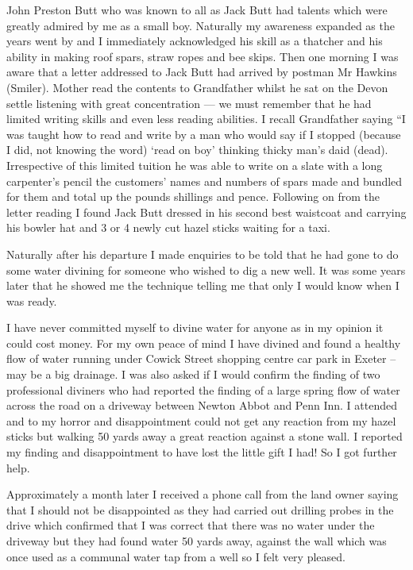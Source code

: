 John Preston Butt who was known to all as Jack Butt had talents which were
greatly admired by me as a small boy. Naturally my awareness expanded as the
years went by and I immediately acknowledged his skill as a thatcher and his
ability in making roof spars, straw ropes and bee skips. Then one morning I
was aware that a letter addressed to Jack Butt had arrived by postman Mr
Hawkins (Smiler). Mother read the contents to Grandfather whilst he sat on the
Devon settle listening with great concentration --- we must remember that he
had limited writing skills and even less reading abilities. I recall
Grandfather saying ``I was taught how to read and write by a man who would say
if I stopped (because I did, not knowing the word) `read on boy' thinking
thicky man's daid (dead). Irrespective of this limited tuition he was able to
write on a slate with a long carpenter's pencil the customers' names and
numbers of spars made and bundled for them and total up the pounds shillings
and pence. Following on from the letter reading I found Jack Butt dressed in
his second best waistcoat and carrying his bowler hat and 3 or 4 newly cut
hazel sticks waiting for a taxi.

Naturally after his departure I made enquiries to be told that he had gone to do
some water divining for someone who wished to dig a new well. It was some
years later that he showed me the technique telling me that only I would know
when I was ready.

I have never committed myself to divine water for anyone as in my opinion it
could cost money. For my own peace of mind I have divined and found a healthy
flow of water running under Cowick Street shopping centre car park in Exeter –
may be a big drainage. I was also asked if I would confirm the finding of two
professional diviners who had reported the finding of a large spring flow of
water across the road on a driveway between Newton Abbot and Penn Inn. I attended and
to my horror and disappointment could not get any reaction from my hazel sticks
but walking 50 yards away a great reaction against a stone wall. I reported my
finding and disappointment to have lost the little gift I had! So I got
further help.

Approximately a month later I received a phone call from the land owner saying
that I should not be disappointed as they had carried out drilling probes in
the drive which confirmed that I was correct that there was no water under the
driveway but they had found water 50 yards away, against the wall which was
once used as a communal water tap from a well so I felt very pleased.

